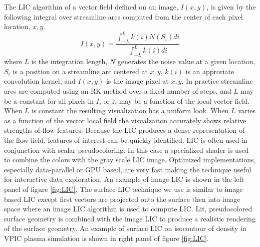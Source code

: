 \documentclass[a4paper,10pt]{article}
\begin{document}
The LIC algorithm of a vector field defined on an image, $I(x,y)$, is given by the following integral over streamline arcs computed from the center of each pixel location, $x,y$.
\begin{equation}
 I(x,y) = \frac{\displaystyle \int_{-L}^{L} k(i)N(S_i)di}{\displaystyle \int_{-L}^{L} k(i) di}
\end{equation}
where $L$ is the integration length, $N$ generates the noise value at a given location, $S_i$ is a position on a streamline arc centered at $x,y$, $k(i)$ is an approriate convolution kernel, and $I(x,y)$ is the image  pixel at $x,y$. In practice streamline arcs are computed using an RK method over a fixed number of steps, and $L$ may be a constant for all pixels in $I$, or it may be a function of the local vector field. When $L$ is constant the resulting visualization has a uniform look. When $L$ varies as a function of the vector local field the visualzaiton accurately shows relative strengths of flow features. Because the LIC produces a dense representation of the flow field, features of interest can be quickly identified. LIC is often used in conjunction with scalar pseudocoloring. In this case a specialized shader is used to combine the colors with the gray scale LIC image. Optimized implementations, especially data-parallel or GPU based, are very fast making the technique useful for interactive data exploration. An example of image LIC is shown in the left panel of figure \ref{fig:LIC}. The surface LIC technique we use is similar to image based LIC except first vectors are projected onto the surface then into image space where an image LIC algorithm is used to compute LIC\cite{LIC2}. Lit, pseudocolored surface geometry is combined with the image LIC to produce a realistic rendering of the surface geometry. An example of surface LIC on isocontour of density in VPIC plasma simulation is shown in right panel of figure \ref{fig:LIC}.
\end{document}
